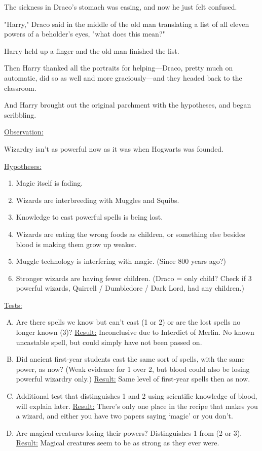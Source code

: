 The sickness in Draco's stomach was easing, and now he just felt confused.

"Harry," Draco said in the middle of the old man translating a list of all
eleven powers of a beholder's eyes, "what does this mean?"

Harry held up a finger and the old man finished the list.

Then Harry thanked all the portraits for helping---Draco, pretty much on
automatic, did so as well and more graciously---and they headed back to the
classroom.

And Harry brought out the original parchment with the hypotheses, and began
scribbling.

\begin{writtenNote}
    \uline{Observation:}

    \SmallVSpace
    Wizardry isn't as powerful now as it was when Hogwarts was founded.

    \SmallVSpace
    \uline{Hypotheses:}

    \SmallVSpace
    \begin{enumerate}[1.]
        \item Magic itself is fading.
        \item Wizards are interbreeding with Muggles and Squibs.
        \item Knowledge to cast powerful spells is being lost.
        \item Wizards are eating the wrong foods as children, or something else besides blood is making them grow up weaker.
        \item Muggle technology is interfering with magic. (Since 800 years ago?)
        \item Stronger wizards are having fewer children. (Draco = only child? Check if 3 powerful wizards, Quirrell / Dumbledore / Dark Lord, had any children.)
    \end{enumerate}

    \SmallVSpace
    \uline{Tests:}

    \SmallVSpace
    \begin{enumerate}[A.]
        \item Are there spells we know but can't cast (1 or 2) or are the lost spells no longer known (3)? \uline{Result:} Inconclusive due to Interdict of Merlin. No known uncastable spell, but could simply have not been passed on.
        \item Did ancient first-year students cast the same sort of spells, with the same power, as now? (Weak evidence for 1 over 2, but blood could also be losing powerful wizardry only.) \uline{Result:} Same level of first-year spells then as now.
        \item Additional test that distinguishes 1 and 2 using scientific knowledge of blood, will explain later. \uline{Result:} There's only one place in the recipe that makes you a wizard, and either you have two papers saying `magic' or you don't.
        \item Are magical creatures losing their powers? Distinguishes 1 from (2 or 3). \uline{Result:} Magical creatures seem to be as strong as they ever were.
    \end{enumerate}
\end{writtenNote}


